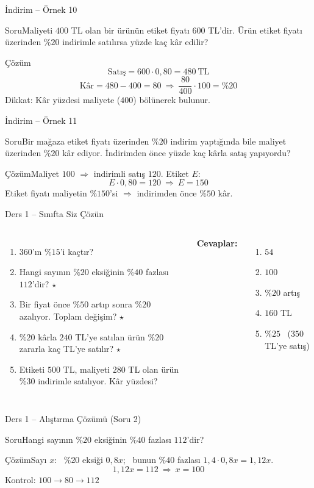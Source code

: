 \documentclass[aspectratio=169,11pt]{beamer}
\newcommand{\soru}[3]{%
\begin{frame}{#1}
  \begin{block}{Soru}\large #2\end{block}
  \pause
  \begin{exampleblock}{Çözüm}\large #3\end{exampleblock}
\end{frame}}
\begin{document}
\soru{İndirim -- Örnek 10}
{Maliyeti \(400\) TL olan bir ürünün etiket fiyatı \(600\) TL'dir. Ürün etiket fiyatı üzerinden \(\%20\) indirimle satılırsa yüzde kaç kâr edilir?}
{\[\text{Satış}=600\cdot 0{,}80=480\ \text{TL}\]
\[\text{Kâr}=480-400=80\ \Rightarrow\ \frac{80}{400}\cdot 100=\%20\]
Dikkat: Kâr yüzdesi maliyete (\(400\)) bölünerek bulunur.}

\soru{İndirim -- Örnek 11}
{Bir mağaza etiket fiyatı üzerinden \(\%20\) indirim yaptığında bile maliyet üzerinden \(\%20\) kâr ediyor. İndirimden önce yüzde kaç kârla satış yapıyordu?}
{Maliyet \(100\) \(\Rightarrow\) indirimli satış \(120\). Etiket \(E\):
\[E\cdot 0{,}80=120\ \Rightarrow\ E=150\]
Etiket fiyatı maliyetin \(\%150\)'si \(\Rightarrow\) indirimden önce \(\%50\) kâr.}

\begin{frame}{Ders 1 -- Sınıfta Siz Çözün}
\begin{columns}[t]
\begin{enumerate}
\item \(360\)'ın \(\%15\)'i kaçtır?
\item Hangi sayının \(\%20\) eksiğinin \(\%40\) fazlası \(112\)'dir? \(\star\)
\item Bir fiyat önce \(\%50\) artıp sonra \(\%20\) azalıyor. Toplam değişim? \(\star\)
\item \(\%20\) kârla \(240\) TL'ye satılan ürün \(\%20\) zararla kaç TL'ye satılır? \(\star\)
\item Etiketi \(500\) TL, maliyeti \(280\) TL olan ürün \(\%30\) indirimle satılıyor. Kâr yüzdesi?
\end{enumerate}
\pause
\textbf{Cevaplar:}
\begin{enumerate}
\item \(54\)
\item \(100\)
\item \(\%20\) artış
\item \(160\) TL
\item \(\%25\) \ (\(350\) TL'ye satış)
\end{enumerate}
\end{columns}
\vspace{4pt}{\footnotesize \(\star\) işaretli soruların adım adım çözümü sonraki slaytlardadır.}
\end{frame}

\soru{Ders 1 -- Alıştırma Çözümü (Soru 2)}
{Hangi sayının \(\%20\) eksiğinin \(\%40\) fazlası \(112\)'dir?}
{Sayı \(x\): \ \(\%20\) eksiği \(0{,}8x\); \ bunun \(\%40\) fazlası \(1{,}4\cdot 0{,}8x=1{,}12x\).
\[1{,}12x=112\ \Rightarrow\ x=100\]
Kontrol: \(100\to 80\to 112\) \checkmark}
\end{document}
